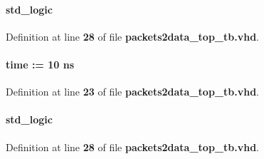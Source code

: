 \paragraph[{clk0}]{ {\bfseries \textcolor{comment}{std\+\_\+logic}\textcolor{vhdlchar}{ }} \hspace{0.3cm}{\ttfamily [Signal]}}\label{classpackets2data__top__tb_1_1tb__behave_a693d72741b9413130fe2d67511b642be}


Definition at line {\bf 28} of file {\bf packets2data\+\_\+top\+\_\+tb.\+vhd}.

\paragraph[{clk0\+\_\+period}]{ {\bfseries \textcolor{comment}{time}\textcolor{vhdlchar}{ }\textcolor{vhdlchar}{ }\textcolor{vhdlchar}{\+:}\textcolor{vhdlchar}{=}\textcolor{vhdlchar}{ }\textcolor{vhdlchar}{ }\textcolor{vhdlchar}{ } \textcolor{vhdldigit}{10} \textcolor{vhdlchar}{ }\textcolor{vhdlchar}{ns}\textcolor{vhdlchar}{ }} \hspace{0.3cm}{\ttfamily [Constant]}}\label{classpackets2data__top__tb_1_1tb__behave_ad03d90619a1930e0f5daa16a616edd90}


Definition at line {\bf 23} of file {\bf packets2data\+\_\+top\+\_\+tb.\+vhd}.

\paragraph[{clk1}]{ {\bfseries \textcolor{comment}{std\+\_\+logic}\textcolor{vhdlchar}{ }} \hspace{0.3cm}{\ttfamily [Signal]}}\label{classpackets2data__top__tb_1_1tb__behave_ade95921e47b0e4d2d11e496794648550}


Definition at line {\bf 28} of file {\bf packets2data\+\_\+top\+\_\+tb.\+vhd}.

